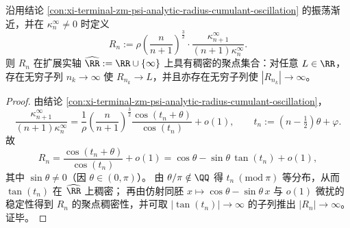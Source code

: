 \begin{proposition}[相邻阶局部增长率在扩展实轴上的稠密聚点]\label{prop:xi-terminal-zm-cumulant-local-growth-dense}
沿用结论 \ref{con:xi-terminal-zm-psi-analytic-radius-cumulant-oscillation} 的振荡渐近，并在 \(\kappa_n^\infty\neq 0\) 时定义
\[
R_n:=\rho\left(\frac{n}{n+1}\right)^{\frac32}\cdot\frac{\kappa_{n+1}^\infty}{(n+1)\kappa_n^\infty}.
\]
则 \(R_n\) 在扩展实轴 \(\widehat{\RR}:=\RR\cup\{\infty\}\) 上具有稠密的聚点集合：对任意 \(L\in\RR\)，存在无穷子列 \(n_k\to\infty\) 使 \(R_{n_k}\to L\)，并且亦存在无穷子列使 \(|R_{n_k}|\to\infty\)。
\end{proposition}
\begin{proof}
由结论 \ref{con:xi-terminal-zm-psi-analytic-radius-cumulant-oscillation}，
\[
\frac{\kappa_{n+1}^\infty}{(n+1)\kappa_n^\infty}
=\frac{1}{\rho}\left(\frac{n}{n+1}\right)^{\frac32}
\frac{\cos(t_n+\theta)}{\cos(t_n)}+o(1),
\qquad
t_n:=(n-\tfrac12)\theta+\varphi.
\]
故
\[
R_n=\frac{\cos(t_n+\theta)}{\cos(t_n)}+o(1)
=\cos\theta-\sin\theta\,\tan(t_n)+o(1),
\]
其中 \(\sin\theta\neq 0\)（因 \(\theta\in(0,\pi)\)）。
由 \(\theta/\pi\notin\QQ\) 得 \(t_n\ (\mathrm{mod}\ \pi)\) 等分布，从而 \(\tan(t_n)\) 在 \(\widehat{\RR}\) 上稠密；
再由仿射同胚 \(x\mapsto \cos\theta-\sin\theta\,x\) 与 \(o(1)\) 微扰的稳定性得到 \(R_n\) 的聚点稠密性，并可取 \(|\tan(t_n)|\to\infty\) 的子列推出 \(|R_n|\to\infty\)。证毕。
\end{proof}

